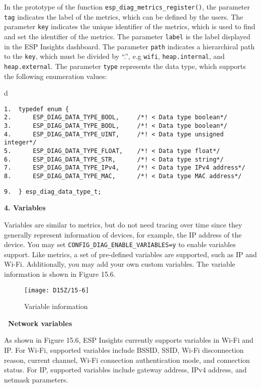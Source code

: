 \documentclass[a4paper,12pt]{book}
\begin{document}
In the prototype of the function \verb|esp_diag_metrics_register()|, the parameter \verb|tag| indicates the label of the metrics, which can be defined by the users. The parameter \verb|key| indicates the unique identifier of the metrics, which is used to find and set the identifier of the metrics. The parameter \verb|label| is the label displayed in the ESP Insights dashboard. The parameter \verb|path| indicates a hierarchical path to the \verb|key|, which must be divided by “.”, e.g \verb|wifi|, \verb|heap.internal|, and \verb|heap.external|. The parameter \verb|type| represents the data type, which supports the following enumeration values:

\begin{codebloc}
\begin{tabular}{d}
\vspace{2pt}
\begin{verbatim}
1.  typedef enum {
2.      ESP_DIAG_DATA_TYPE_BOOL,     /*! < Data type boolean*/
3.      ESP_DIAG_DATA_TYPE_BOOL,     /*! < Data type boolean*/
4.      ESP_DIAG_DATA_TYPE_UINT,     /*! < Data type unsigned integer*/
5.      ESP_DIAG_DATA_TYPE_FLOAT,    /*! < Data type float*/
6.      ESP_DIAG_DATA_TYPE_STR,      /*! < Data type string*/
7.      ESP_DIAG_DATA_TYPE_IPv4,     /*! < Data type IPv4 address*/
8.      ESP_DIAG_DATA_TYPE_MAC,      /*! < Data type MAC address*/
\end{verbatim}
\verb|9.  } esp_diag_data_type_t;|
\end{tabular}
\end{codebloc}

\textbf{4. Variables}

Variables are similar to metrics, but do not need tracing over time since they generally represent information of devices, for example, the IP address of the device. You may set \verb|CONFIG_DIAG_ENABLE_VARIABLES=y| to enable variables support. Like metrics, a set of pre-defined variables are supported, such as IP and Wi-Fi. Additionally, you may add your own custom variables. The variable information is shown in Figure 15.6.

\begin{figure}[!h]
    \centering
    \texttt{[image: D15Z/15-6]}
    \caption{Variable information}
\end{figure}

\textbf{\textbullet\ Network variables}

As shown in Figure 15.6, ESP Insights currently supports variables in Wi-Fi and IP. For Wi-Fi, supported variables include BSSID, SSID, Wi-Fi disconnection reason, current channel, Wi-Fi connection authentication mode, and connection status. For IP, supported variables include gateway address, IPv4 address, and netmask parameters.
\end{document}

